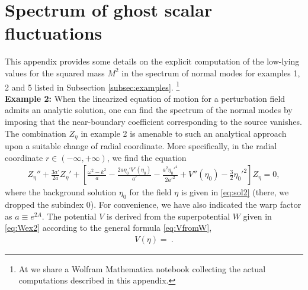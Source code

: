 \section{Spectrum of ghost scalar fluctuations}\label{app:numerics}

This appendix provides some details on the explicit computation of the low-lying values for the squared mass $M^2$ in the spectrum of normal modes for examples 1, 2 and 5 listed in Subsection \ref{subsec:examples}.%
\footnote{
At \cite{code} we share a Wolfram Mathematica notebook collecting the actual computations described in this appendix.
}\\

\noindent 
\textbf{Example 2:}
When the linearized equation of motion for a perturbation field admits an analytic solution, one can find the spectrum of the normal modes by imposing that the near-boundary coefficient corresponding to the source vanishes. The combination $Z_\eta$ in example 2 is amenable to such an analytical approach upon a suitable change of radial coordinate. More specifically, in the radial coordinate $r\in\left(-\infty,+\infty\right)$, we find the equation 
\begin{align}
	Z_\eta''
	+
	\frac{3a'}{2a} Z_\eta'
	+
	\left[
	\frac{\omega^2-k^2}{a}
	-\frac{2a\eta_0' V'(\eta_0)}{a'}
	-\frac{a^2\eta_0'^4}{2 a'^2}
	+V''(\eta_0)
	-\frac{3}{2} \eta_0'^2\right]
	Z_\eta
	=     
	0,
\end{align}
where the background solution $\eta_0$ for the field $\eta$ is given in \eqref{eq:sol2} (there, we dropped the subindex 0). For convenience, we have also indicated the warp factor as $a\equiv e^{2A}$. The potential $V$ is derived from the superpotential $W$ given in \eqref{eq:Wex2} according to the general formula \eqref{eq:VfromW},
\begin{eqnarray}
	V(\eta)
	=
	\ .
\end{eqnarray}

